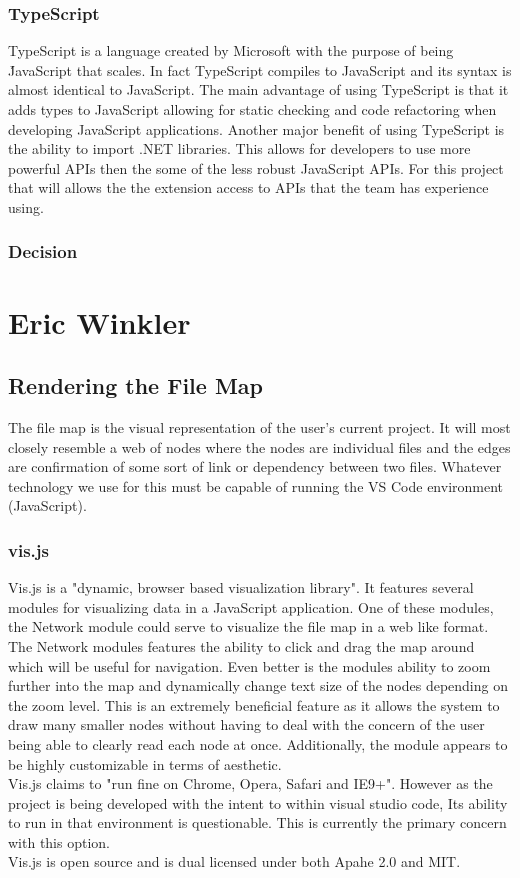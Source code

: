 \documentclass[letterpaper,10pt,titlepage,draftclsnofoot,onecolumn,onesided] {IEEEtran}
\begin{document}
\subsubsection{TypeScript}
TypeScript is a language created by Microsoft with the purpose of being \'JavaScript that scales.\' \cite{TypeScript}
In fact TypeScript compiles to JavaScript and its syntax is almost identical to JavaScript. 
The main advantage of using TypeScript is that it adds types to JavaScript allowing for static checking and code refactoring when developing JavaScript applications. \cite{TypeScript}
Another major benefit of using TypeScript is the ability to import .NET libraries. 
This allows for developers to use more powerful APIs then the some of the less robust JavaScript APIs. 
For this project that will allows the the extension access to APIs that the team has experience using.
\subsubsection{Decision}


\section{Eric Winkler}
\subsection{Rendering the File Map}
The file map is the visual representation of the user's current project. 
It will most closely resemble a web of nodes where the nodes are individual files and the edges are confirmation of some sort of link or dependency between two files. 
Whatever technology we use for this must be capable of running the VS Code environment (JavaScript). \\
\subsubsection{vis.js}
Vis.js is a "dynamic, browser based visualization library". 
It features several modules for visualizing data in a JavaScript application. 
One of these modules, the Network module could serve to visualize the file map in a web like format. 
The Network modules features the ability to click and drag the map around which will be useful for navigation. 
Even better is the modules ability to zoom further into the map and dynamically change text size of the nodes depending on the zoom level. 
This is an extremely beneficial feature as it allows the system to draw many smaller nodes without having to deal with the concern of the user being able to clearly read each node at once. 
Additionally, the module appears to be highly customizable in terms of aesthetic.
\\
Vis.js claims to "run fine on Chrome, Opera, Safari and IE9+". However as the project is being developed with the intent to within visual studio code, Its ability to run in that environment is questionable. This is currently the primary concern with this option.
\\
Vis.js  is open source and is dual licensed under both Apahe 2.0 and MIT.
\end{document}
